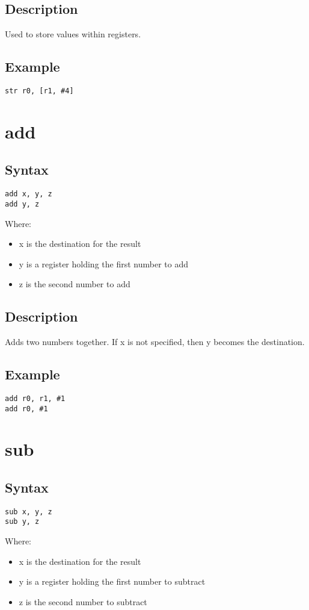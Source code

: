 \documentclass[11pt]{scrartcl}
\begin{document}
\subsection{Description}
Used to store values within registers.
\subsection{Example}
\begin{verbatim}
str r0, [r1, #4]
\end{verbatim}

\section{add}
\subsection{Syntax}
\begin{verbatim}
add x, y, z
add y, z
\end{verbatim}
Where:
\begin{itemize}
    \item x is the destination for the result
    \item y is a register holding the first number to add
    \item z is the second number to add
\end{itemize}
\subsection{Description}
Adds two numbers together. If x is not specified, then y becomes the destination.
\subsection{Example}
\begin{verbatim}
add r0, r1, #1
add r0, #1
\end{verbatim}

\section{sub}
\subsection{Syntax}
\begin{verbatim}
sub x, y, z
sub y, z
\end{verbatim}
Where:
\begin{itemize}
    \item x is the destination for the result
    \item y is a register holding the first number to subtract
    \item z is the second number to subtract
\end{itemize}
\end{document}
